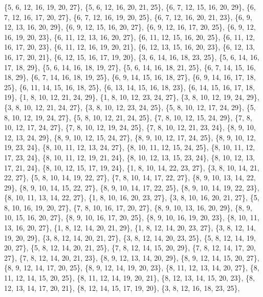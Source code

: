 \documentclass[11pt,a4paper]{article}
\begin{document}
{\{5, 6, 12, 16, 19, 20, 27\}, \{5, 6, 12, 16, 20, 21, 25\}, \{6, 7, 12, 15, 16, 20, 29\}, \{6, 7, 12, 16, 17, 20, 27\}, \{6, 7, 12, 16, 19, 20, 25\},
\{6, 7, 12, 16, 20, 21, 23\}, \{6, 9, 12, 13, 16, 20, 29\}, \{6, 9, 12, 15, 16, 20, 27\}, \{6, 9, 12, 16, 17, 20, 25\}, \{6, 9, 12, 16, 19, 20, 23\},
\{6, 11, 12, 13, 16, 20, 27\}, \{6, 11, 12, 15, 16, 20, 25\}, \{6, 11, 12, 16, 17, 20, 23\}, \{6, 11, 12, 16, 19, 20, 21\}, \{6, 12, 13, 15, 16, 20, 23\},
\{6, 12, 13, 16, 17, 20, 21\}, \{6, 12, 15, 16, 17, 19, 20\}, \{3, 6, 14, 16, 18, 23, 25\}, \{5, 6, 14, 16, 17, 18, 29\}, \{5, 6, 14, 16, 18, 19, 27\},
\{5, 6, 14, 16, 18, 21, 25\}, \{6, 7, 14, 15, 16, 18, 29\}, \{6, 7, 14, 16, 18, 19, 25\}, \{6, 9, 14, 15, 16, 18, 27\}, \{6, 9, 14, 16, 17, 18, 25\},
\{6, 11, 14, 15, 16, 18, 25\}, \{6, 13, 14, 15, 16, 18, 23\}, \{6, 14, 15, 16, 17, 18, 19\}, \{1, 8, 10, 12, 21, 24, 29\}, \{1, 8, 10, 12, 23, 24, 27\},
\{3, 8, 10, 12, 19, 24, 29\}, \{3, 8, 10, 12, 21, 24, 27\}, \{3, 8, 10, 12, 23, 24, 25\}, \{5, 8, 10, 12, 17, 24, 29\}, \{5, 8, 10, 12, 19, 24, 27\},
\{5, 8, 10, 12, 21, 24, 25\}, \{7, 8, 10, 12, 15, 24, 29\}, \{7, 8, 10, 12, 17, 24, 27\}, \{7, 8, 10, 12, 19, 24, 25\}, \{7, 8, 10, 12, 21, 23, 24\},
\{8, 9, 10, 12, 13, 24, 29\}, \{8, 9, 10, 12, 15, 24, 27\}, \{8, 9, 10, 12, 17, 24, 25\}, \{8, 9, 10, 12, 19, 23, 24\}, \{8, 10, 11, 12, 13, 24, 27\},
\{8, 10, 11, 12, 15, 24, 25\}, \{8, 10, 11, 12, 17, 23, 24\}, \{8, 10, 11, 12, 19, 21, 24\}, \{8, 10, 12, 13, 15, 23, 24\}, \{8, 10, 12, 13, 17, 21, 24\},
\{8, 10, 12, 15, 17, 19, 24\}, \{1, 8, 10, 14, 22, 23, 27\}, \{3, 8, 10, 14, 21, 22, 27\}, \{5, 8, 10, 14, 19, 22, 27\}, \{7, 8, 10, 14, 17, 22, 27\},
\{8, 9, 10, 13, 14, 22, 29\}, \{8, 9, 10, 14, 15, 22, 27\}, \{8, 9, 10, 14, 17, 22, 25\}, \{8, 9, 10, 14, 19, 22, 23\}, \{8, 10, 11, 13, 14, 22, 27\},
\{1, 8, 10, 16, 20, 23, 27\}, \{3, 8, 10, 16, 20, 21, 27\}, \{5, 8, 10, 16, 19, 20, 27\}, \{7, 8, 10, 16, 17, 20, 27\}, \{8, 9, 10, 13, 16, 20, 29\},
\{8, 9, 10, 15, 16, 20, 27\}, \{8, 9, 10, 16, 17, 20, 25\}, \{8, 9, 10, 16, 19, 20, 23\}, \{8, 10, 11, 13, 16, 20, 27\}, \{1, 8, 12, 14, 20, 21, 29\},
\{1, 8, 12, 14, 20, 23, 27\}, \{3, 8, 12, 14, 19, 20, 29\}, \{3, 8, 12, 14, 20, 21, 27\}, \{3, 8, 12, 14, 20, 23, 25\}, \{5, 8, 12, 14, 19, 20, 27\},
\{5, 8, 12, 14, 20, 21, 25\}, \{7, 8, 12, 14, 15, 20, 29\}, \{7, 8, 12, 14, 17, 20, 27\}, \{7, 8, 12, 14, 20, 21, 23\}, \{8, 9, 12, 13, 14, 20, 29\},
\{8, 9, 12, 14, 15, 20, 27\}, \{8, 9, 12, 14, 17, 20, 25\}, \{8, 9, 12, 14, 19, 20, 23\}, \{8, 11, 12, 13, 14, 20, 27\}, \{8, 11, 12, 14, 15, 20, 25\},
\{8, 11, 12, 14, 19, 20, 21\}, \{8, 12, 13, 14, 15, 20, 23\}, \{8, 12, 13, 14, 17, 20, 21\}, \{8, 12, 14, 15, 17, 19, 20\}, \{3, 8, 12, 16, 18, 23, 25\},
}
\end{document}
